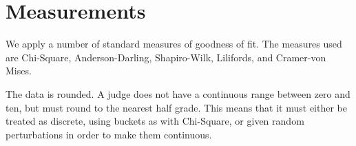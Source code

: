 \section{Measurements}
We apply a number of standard measures of goodness of fit. The measures used
are Chi-Square, Anderson-Darling, Shapiro-Wilk, Lilifords, and Cramer-von Mises.

The data is rounded. A judge does not have a continuous range between
zero and ten, but must round to the nearest half grade. This means that
it must either be treated as discrete, using buckets as with Chi-Square,
or given random perturbations in order to make them continuous.
